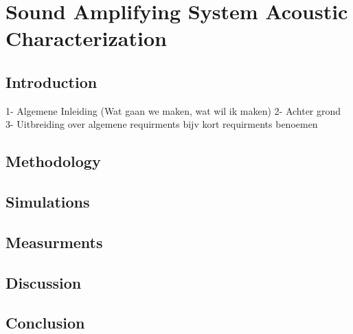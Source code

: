 \chapter{Sound Amplifying System Acoustic Characterization}
\label{chapter:AcousticCharacterization}

\section{Introduction}
1- Algemene Inleiding (Wat gaan we maken, wat wil ik maken)
2- Achter grond
3- Uitbreiding over algemene requirments bijv kort requirments benoemen

\section{Methodology}

\section{Simulations}

\section{Measurments}

\section{Discussion}

\section{Conclusion}
